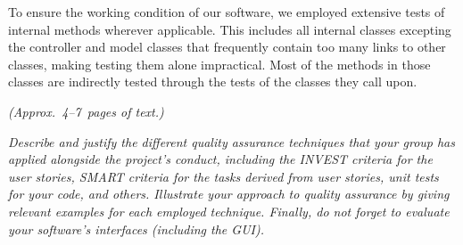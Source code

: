 To ensure the working condition of our software, we employed extensive tests of internal methods wherever applicable. 
This includes all internal classes excepting the controller and model classes that frequently contain too many links to other classes, making testing them alone impractical. Most of the methods in those classes are indirectly tested through the tests of the classes they call upon. 


\emph{(Approx.~4--7~pages of text.)}

\emph{Describe and justify the different quality assurance techniques that your group has applied alongside the project's conduct, including the INVEST criteria for the user stories, SMART criteria for the tasks derived from user stories, unit tests for your code, and others.  Illustrate your approach to quality assurance by giving relevant examples for each employed technique. Finally, do not forget to evaluate your software's interfaces (including the GUI).}